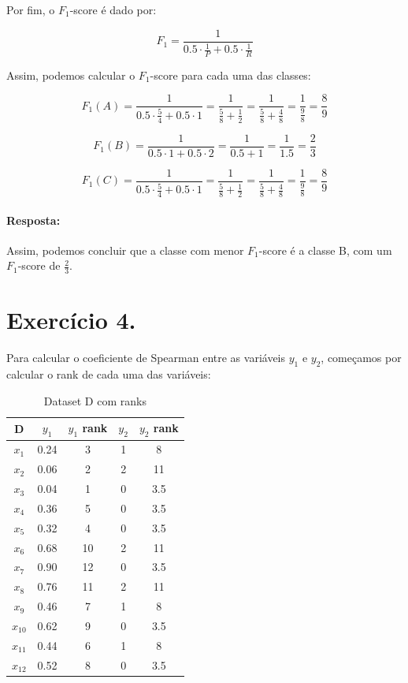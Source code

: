\documentclass{article}
\begin{document}
Por fim, o $F_1$-score é dado por:

\[ F_1 = \frac{1}{0.5\cdot \frac{1}{P} + 0.5\cdot \frac{1}{R}} \]

Assim, podemos calcular o $F_1$-score para cada uma das classes:

\[ F_1(A) = \frac{1}{0.5\cdot \frac{5}{4} + 0.5\cdot 1} = \frac{1}{\frac{5}{8} + \frac{1}{2}} = \frac{1}{\frac{5}{8} + \frac{4}{8}} = \frac{1}{\frac{9}{8}} = \frac{8}{9} \]

\[ F_1(B) = \frac{1}{0.5\cdot 1 + 0.5\cdot 2} = \frac{1}{0.5 + 1} = \frac{1}{1.5} = \frac{2}{3} \]

\[ F_1(C) = \frac{1}{0.5\cdot \frac{5}{4} + 0.5\cdot 1} = \frac{1}{\frac{5}{8} + \frac{1}{2}} = \frac{1}{\frac{5}{8} + \frac{4}{8}} = \frac{1}{\frac{9}{8}} = \frac{8}{9} \]

\paragraph{Resposta: }
Assim, podemos concluir que a classe com menor $F_1$-score é a classe B, com um $F_1$-score de $\frac{2}{3}$.

\newpage

\section*{Exercício 4.}

Para calcular o coeficiente de Spearman entre as variáveis $y_1$ e $y_2$, começamos por calcular o rank de cada uma das variáveis:

\begin{table}[h!]
  \centering
  \begin{tabular}{|c|c|c|c|c|}
    \hline
    D      & $y_1$ & $y_1$ rank & $y_2$ & $y_2$ rank \\ \hline
    $x_1$  & 0.24  & 3          & 1     & 8          \\ \hline
    $x_2$  & 0.06  & 2          & 2     & 11          \\ \hline
    $x_3$  & 0.04  & 1          & 0     & 3.5         \\ \hline
    $x_4$  & 0.36  & 5          & 0     & 3.5          \\ \hline
    $x_5$  & 0.32  & 4          & 0     & 3.5          \\ \hline
    $x_6$  & 0.68  & 10          & 2     & 11          \\ \hline
    $x_7$  & 0.90  & 12          & 0     & 3.5          \\ \hline
    $x_8$  & 0.76  & 11          & 2     & 11          \\ \hline
    $x_9$  & 0.46  & 7          & 1     & 8         \\ \hline
    $x_{10}$ & 0.62  & 9          & 0     & 3.5          \\ \hline
    $x_{11}$ & 0.44  & 6          & 1     & 8          \\ \hline
    $x_{12}$ & 0.52  & 8          & 0     & 3.5          \\ \hline
  \end{tabular}
  \caption{Dataset D com ranks}
  \label{tab:datasetD_ranks}
\end{table}
\end{document}
